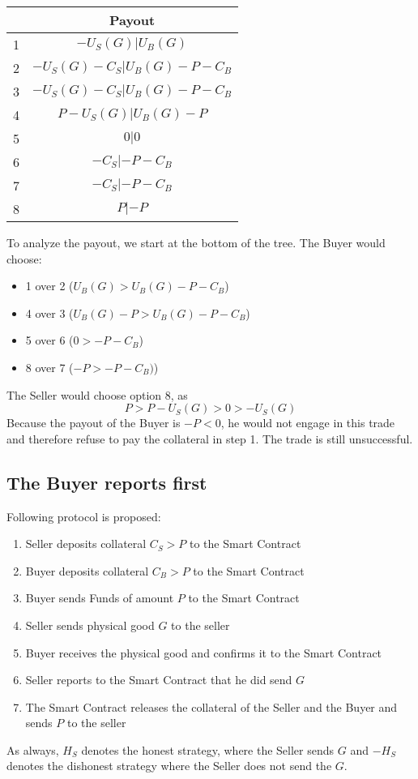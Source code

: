 \documentclass{cacthesis}
\begin{document}
\begin{center}
\begin{tabular}{ |c|c| }
\hline
& Payout  \\
\hline
\hline
1& $-U_S(G) | U_B(G)$\\
\hline
2& $-U_S(G) - C_S| U_B(G)- P - C_B $\\
\hline
3&$-U_S(G) - C_S | U_B(G) -P - C_B$ \\
\hline
4& $P-U_S(G)| U_B(G)-P$\\
\hline
5& $0|0$\\
\hline 
6& $-C_S |-P - C_B$\\
\hline
7& $-C_S| -P-C_B$\\
\hline
8& $P| -P$\\
\hline
\end{tabular}
\end{center}

To analyze the payout, we start at the bottom of the tree. The Buyer would choose:
\begin{itemize}
    \item 1 over 2 ($U_B(G) > U_B(G) -P -C_B$)
    \item 4 over 3 ($U_B(G) - P > U_B(G) -P -C_B$)
    \item 5 over 6 ($0 > -P -C_B$)
    \item 8 over 7 ($-P > -P -C_B)$)
\end{itemize}
The Seller would choose option 8, as 
\[P>P-U_S(G)>0>-U_S(G)\]
Because the payout of the Buyer is $-P<0$, he would not engage in this trade and therefore refuse to pay the collateral in step 1. The trade is still unsuccessful.

\subsection{The Buyer reports first}
Following protocol is proposed:
\begin{enumerate}
    \item Seller deposits collateral $C_S > P$ to the Smart Contract
    \item Buyer deposits collateral $C_B > P$ to the Smart Contract
    \item Buyer sends Funds of amount $P$ to the Smart Contract
    \item Seller sends physical good $G$ to the seller
    \item Buyer receives the physical good and confirms it to the Smart Contract
    \item Seller reports to the Smart Contract that he did send $G$
    \item The Smart Contract releases the collateral of the Seller and the Buyer and sends $P$ to the seller
\end{enumerate}
As always, $H_S$ denotes the honest strategy, where the Seller sends $G$ and $-H_S$ denotes the dishonest strategy where the Seller does not send the $G$.
\end{document}
